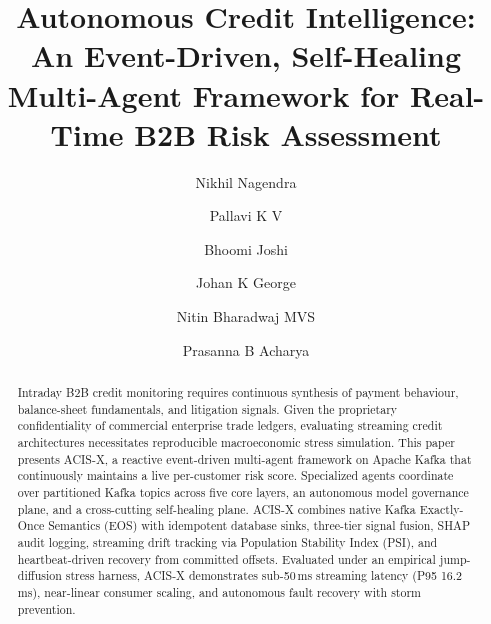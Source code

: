 \documentclass[runningheads]{llncs}
\begin{document}
\title{Autonomous Credit Intelligence: An Event-Driven, Self-Healing Multi-Agent Framework for Real-Time B2B Risk Assessment}


\author{Nikhil Nagendra \and
Pallavi K V \and
Bhoomi Joshi \and
Johan K George \and
Nitin Bharadwaj MVS \and
Prasanna B Acharya }



\maketitle

\begin{abstract}
Intraday B2B credit monitoring requires continuous synthesis of payment behaviour, balance-sheet fundamentals, and litigation signals. Given the proprietary confidentiality of commercial enterprise trade ledgers, evaluating streaming credit architectures necessitates reproducible macroeconomic stress simulation. This paper presents ACIS-X, a reactive event-driven multi-agent framework on Apache Kafka that continuously maintains a live per-customer risk score. Specialized agents coordinate over partitioned Kafka topics across five core layers, an autonomous model governance plane, and a cross-cutting self-healing plane. ACIS-X combines native Kafka Exactly-Once Semantics (EOS) with idempotent database sinks, three-tier signal fusion, SHAP audit logging, streaming drift tracking via Population Stability Index (PSI), and heartbeat-driven recovery from committed offsets. Evaluated under an empirical jump-diffusion stress harness, ACIS-X demonstrates sub-50\,ms streaming latency (P95 16.2\,ms), near-linear consumer scaling, and autonomous fault recovery with storm prevention.
\end{abstract}
\end{document}
